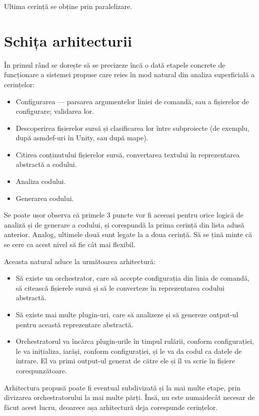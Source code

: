 \documentclass[a4paper,12pt]{report}
\begin{document}
Ultima cerință se obține prin paralelizare.

\section{Schița arhitecturii}

În primul rând se dorește să se precizeze încă o dată etapele concrete de funcționare a sistemei propuse care reies în mod natural din analiza superficială a cerințelor:

\begin{itemize}
\item Configurarea --- parsarea argumentelor liniei de comandă, sau a fișierelor de configurare; validarea lor.
\item Descoperirea fișierelor sursă și clasificarea lor între subproiecte (de exemplu, după asmdef-uri în Unity, sau după mape).
\item Citirea conținutului fișierelor sursă, convertarea textului în reprezentarea abstractă a codului.
\item Analiza codului.
\item Generarea codului.
\end{itemize}

Se poate ușor observa că primele 3 puncte vor fi aceeași pentru orice logică de analiză și de generare a codului, și corespundă la prima cerință din lista adusă anterior.
Analog, ultimele două sunt legate la a doua cerință.
Să se țină minte că se cere ca acest nivel să fie cât mai flexibil.

Aceasta natural aduce la următoarea arhitectură:

\begin{itemize}
  \item Să existe un orchestrator, care să accepte configurația din linia de comandă, să citească fișierele sursă și să le converteze în reprezentarea codului abstractă.
  \item Să existe mai multe plugin-uri, care să analizeze și să genereze output-ul pentru această reprezentare abstractă.
  \item Orchestratorul va încărca plugin-urile în timpul rulării, conform configurației, le va inițializa, iarăși, conform configurației, și le va da codul ca datele de intrare. El va primi output-ul generat de către ele și îl va scrie în fișiere corespunzătoare.
\end{itemize}

Arhitectura propusă poate fi eventual subdivizată și la mai multe etape, prin divizarea orchestratorului la mai multe părți.
Însă, nu este numaidecât necesar de făcut acest lucru, deoarece așa arhitectură deja corespunde cerințelor.
\end{document}
